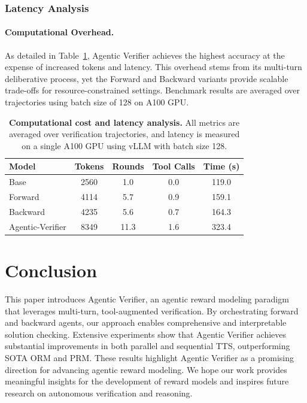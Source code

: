 \documentclass[11pt]{article}
\begin{document}
\subsubsection{Latency Analysis}
\paragraph{Computational Overhead.} As detailed in Table~\ref{tab:latency}, Agentic Verifier achieves the highest accuracy at the expense of increased tokens and latency. This overhead stems from its multi-turn deliberative process, yet the Forward and Backward variants provide scalable trade-offs for resource-constrained settings. Benchmark results are averaged over trajectories using batch size of 128 on A100 GPU.

\begin{table}[t]
\centering
\small
\setlength{\tabcolsep}{3.8pt}
\begin{tabular}{lcccc}
\toprule
Model & Tokens & Rounds & Tool Calls & Time (s) \\
\midrule
Base & 2560 & 1.0 & 0.0 & 119.0 \\
Forward & 4114 & 5.7 & 0.9 & 159.1 \\
Backward & 4235 & 5.6 & 0.7 & 164.3 \\
Agentic-Verifier & 8349 & 11.3 & 1.6 & 323.4 \\
\bottomrule
\end{tabular}
\caption{
\textbf{Computational cost and latency analysis.}
All metrics are averaged over verification trajectories, and latency is measured on a single A100 GPU using vLLM with batch size 128.
}
\label{tab:latency}
\vspace{-2mm}
\end{table}

\section{Conclusion}
This paper introduces Agentic Verifier, an agentic reward modeling paradigm that leverages multi-turn, tool-augmented verification. 
By orchestrating forward and backward agents, our approach enables comprehensive and interpretable solution checking.
Extensive experiments show that Agentic Verifier achieves substantial improvements in both parallel and sequential TTS, outperforming SOTA ORM and PRM. These results highlight Agentic Verifier as a promising direction for advancing agentic reward modeling.
We hope our work provides meaningful insights for the development of reward models and inspires future research on autonomous verification and reasoning.
\end{document}
